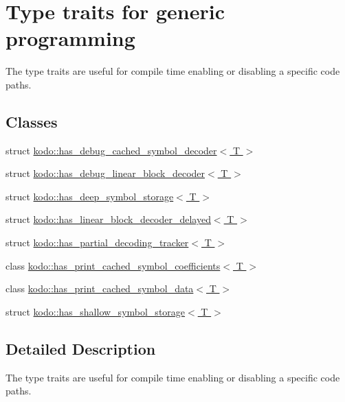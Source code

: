 \hypertarget{group__type__traits}{\section{Type traits for generic programming}
\label{group__type__traits}
}


The type traits are useful for compile time enabling or disabling a specific code paths.  


\subsection*{Classes}
\begin{DoxyCompactItemize}
\item 
struct \hyperlink{structkodo_1_1has__debug__cached__symbol__decoder}{kodo\-::has\-\_\-debug\-\_\-cached\-\_\-symbol\-\_\-decoder$<$ T $>$}
\item 
struct \hyperlink{structkodo_1_1has__debug__linear__block__decoder}{kodo\-::has\-\_\-debug\-\_\-linear\-\_\-block\-\_\-decoder$<$ T $>$}
\item 
struct \hyperlink{structkodo_1_1has__deep__symbol__storage}{kodo\-::has\-\_\-deep\-\_\-symbol\-\_\-storage$<$ T $>$}
\item 
struct \hyperlink{structkodo_1_1has__linear__block__decoder__delayed}{kodo\-::has\-\_\-linear\-\_\-block\-\_\-decoder\-\_\-delayed$<$ T $>$}
\item 
struct \hyperlink{structkodo_1_1has__partial__decoding__tracker}{kodo\-::has\-\_\-partial\-\_\-decoding\-\_\-tracker$<$ T $>$}
\item 
class \hyperlink{classkodo_1_1has__print__cached__symbol__coefficients}{kodo\-::has\-\_\-print\-\_\-cached\-\_\-symbol\-\_\-coefficients$<$ T $>$}
\item 
class \hyperlink{classkodo_1_1has__print__cached__symbol__data}{kodo\-::has\-\_\-print\-\_\-cached\-\_\-symbol\-\_\-data$<$ T $>$}
\item 
struct \hyperlink{structkodo_1_1has__shallow__symbol__storage}{kodo\-::has\-\_\-shallow\-\_\-symbol\-\_\-storage$<$ T $>$}
\end{DoxyCompactItemize}


\subsection{Detailed Description}
The type traits are useful for compile time enabling or disabling a specific code paths. 